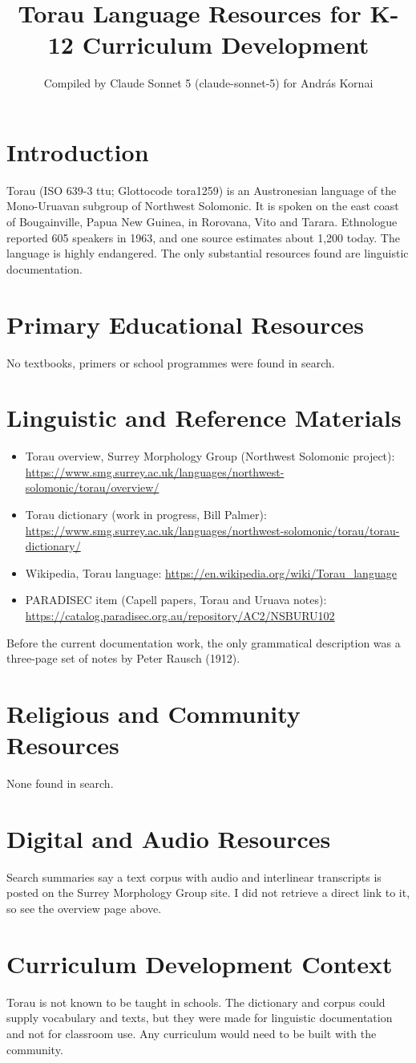 \documentclass[12pt]{article}
\title{Torau Language Resources for K-12 Curriculum Development}
\author{Compiled by Claude Sonnet 5 (claude-sonnet-5) for Andr\'as Kornai}
\date{}
\begin{document}
\maketitle
\section{Introduction}
Torau (ISO 639-3 ttu; Glottocode tora1259) is an Austronesian language of the Mono-Uruavan subgroup of Northwest Solomonic. It is spoken on the east coast of Bougainville, Papua New Guinea, in Rorovana, Vito and Tarara. Ethnologue reported 605 speakers in 1963, and one source estimates about 1,200 today. The language is highly endangered. The only substantial resources found are linguistic documentation.
\section{Primary Educational Resources}
No textbooks, primers or school programmes were found in search.
\section{Linguistic and Reference Materials}
\begin{itemize}
\item Torau overview, Surrey Morphology Group (Northwest Solomonic project): \url{https://www.smg.surrey.ac.uk/languages/northwest-solomonic/torau/overview/}
\item Torau dictionary (work in progress, Bill Palmer): \url{https://www.smg.surrey.ac.uk/languages/northwest-solomonic/torau/torau-dictionary/}
\item Wikipedia, Torau language: \url{https://en.wikipedia.org/wiki/Torau_language}
\item PARADISEC item (Capell papers, Torau and Uruava notes): \url{https://catalog.paradisec.org.au/repository/AC2/NSBURU102}
\end{itemize}
Before the current documentation work, the only grammatical description was a three-page set of notes by Peter Rausch (1912).
\section{Religious and Community Resources}
None found in search.
\section{Digital and Audio Resources}
Search summaries say a text corpus with audio and interlinear transcripts is posted on the Surrey Morphology Group site. I did not retrieve a direct link to it, so see the overview page above.
\section{Curriculum Development Context}
Torau is not known to be taught in schools. The dictionary and corpus could supply vocabulary and texts, but they were made for linguistic documentation and not for classroom use. Any curriculum would need to be built with the community.
\end{document}
